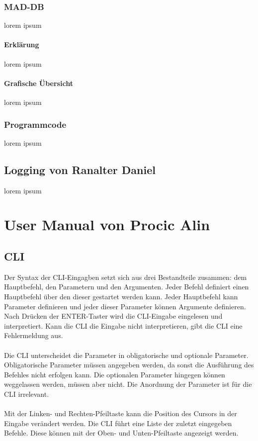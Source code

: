 \documentclass[12pt,a4paper]{report}
\begin{document}
\section{MAD-DB}
lorem ipsum
\subsection{Erklärung}
lorem ipsum
\subsection{Grafische Übersicht}
lorem ipsum
\section{Programmcode}
lorem ipsum

\chapter{Logging von Ranalter Daniel}
lorem ipsum


\part{User Manual von Procic Alin}

\chapter{CLI}

Der Syntax der CLI-Eingagben setzt sich aus drei Bestandteile zusammen: dem Hauptbefehl, den Parametern und den Argumenten. Jeder Befehl definiert einen Hauptbefehl über den dieser gestartet werden kann. Jeder Hauptbefehl kann Parameter definieren und jeder dieser Parameter können Argumente definieren. Nach Drücken der ENTER-Taster wird die CLI-Eingabe eingelesen und interpretiert. Kann die CLI die Eingabe nicht interpretieren,  gibt die CLI eine Fehlermeldung aus.\\\\
Die CLI unterscheidet die Parameter in obligatorische und optionale Parameter. Obligatorische Parameter müssen angegeben werden, da sonst die Ausführung des Befehles nicht erfolgen kann. Die optionalen Parameter hingegen können weggelassen werden, müssen aber nicht. Die Anordnung der Parameter ist für die CLI irrelevant.\\\\
Mit der Linken- und Rechten-Pfeiltaste kann die Position des Cursors in der Eingabe verändert werden. Die CLI führt eine Liste der zuletzt eingegeben Befehle. Diese können mit der Oben- und Unten-Pfeiltaste angezeigt werden.
\end{document}
